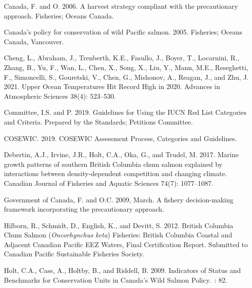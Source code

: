 \documentclass[11pt]{book}
\begin{document}
\hypertarget{refs}{}
\begin{CSLReferences}{1}{0}
\leavevmode\hypertarget{ref-fisheries_and_oceans_canada_harvest_2006}{}%
Canada, F. and O. 2006. A harvest strategy compliant with the precautionary approach. Fisheries; Oceans Canada.

\leavevmode\hypertarget{ref-canada_canadas_2005}{}%
Canada's policy for conservation of wild {Pacific} salmon. 2005. Fisheries; Oceans Canada, Vancouver.

\leavevmode\hypertarget{ref-cheng_upper_2021}{}%
Cheng, L., Abraham, J., Trenberth, K.E., Fasullo, J., Boyer, T., Locarnini, R., Zhang, B., Yu, F., Wan, L., Chen, X., Song, X., Liu, Y., Mann, M.E., Reseghetti, F., Simoncelli, S., Gouretski, V., Chen, G., Mishonov, A., Reagan, J., and Zhu, J. 2021. Upper {Ocean} {Temperatures} {Hit} {Record} {High} in 2020. Advances in Atmospheric Sciences 38(4): 523--530.

\leavevmode\hypertarget{ref-iucn_standards_and_petitions_committee_guidelines_2019}{}%
Committee, I.S. and P. 2019. Guidelines for {Using} the {IUCN} {Red} {List} {Categories} and {Criteria}. Prepared by the Standards; Petitions Committee.

\leavevmode\hypertarget{ref-cosewic_cosewic_2019}{}%
COSEWIC. 2019. {COSEWIC} {Assessment} {Process}, {Categories} and {Guidelines}.

\leavevmode\hypertarget{ref-debertin_marine_2017}{}%
Debertin, A.J., Irvine, J.R., Holt, C.A., Oka, G., and Trudel, M. 2017. Marine growth patterns of southern {British} {Columbia} chum salmon explained by interactions between density-dependent competition and changing climate. Canadian Journal of Fisheries and Aquatic Sciences 74(7): 1077--1087.

\leavevmode\hypertarget{ref-government_of_canada_fishery_2009}{}%
Government of Canada, F. and O.C. 2009, March. A fishery decision-making framework incorporating the precautionary approach.

\leavevmode\hypertarget{ref-hilborn_british_2012}{}%
Hilborn, R., Schmidt, D., English, K., and Devitt, S. 2012. British {Columbia} {Chum} {Salmon} (\emph{{Oncorhynchus} keta}) {Fisheries}: {British} {Columbia} {Coastal} and {Adjacent} {Canadian} {Pacific} {EEZ} {Waters}, {Final} {Certification} {Report}. Submitted to Canadian Pacific Sustainable Fisheries Society.

\leavevmode\hypertarget{ref-holt_indicators_2009}{}%
Holt, C.A., Cass, A., Holtby, B., and Riddell, B. 2009. Indicators of {Status} and {Benchmarks} for {Conservation} {Units} in {Canada}'s {Wild} {Salmon} {Policy}.~: 82.


\end{CSLReferences}
\end{document}
